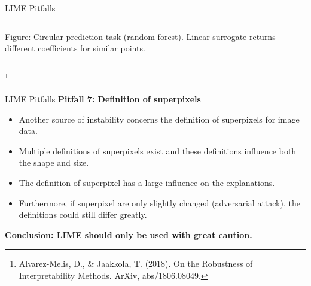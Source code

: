 \documentclass[11pt,compress,t,notes=noshow, xcolor=table]{beamer}
\begin{document}
\begin{vbframe}{LIME Pitfalls}
\begin{columns}
\begin{column}{0.48\textwidth}
\begin{center}
	\tiny{Figure: Circular prediction task (random forest). Linear surrogate returns different coefficients for similar points.}
	
	\end{center}
\end{column}
\end{columns}
\vspace{-0.2cm}
\footnote[frame]{Alvarez-Melis, D., \& Jaakkola, T. (2018). On the Robustness of Interpretability Methods. ArXiv, abs/1806.08049.}
\end{vbframe}

\begin{vbframe}{LIME Pitfalls}
\textbf{Pitfall 7: Definition of superpixels}
\begin{itemize}
	\item Another source of instability concerns the definition of superpixels for image data. 
	\item Multiple definitions of superpixels exist and these definitions influence both the shape and size. 
	\item The definition of superpixel has a large influence on the explanations. 
	\item Furthermore, if superpixel are only slightly changed (adversarial attack), the definitions could still differ greatly.  
\end{itemize}

\textbf{Conclusion: LIME should only be used with great caution.}

\end{vbframe}

%	


\endlecture
\end{document}
